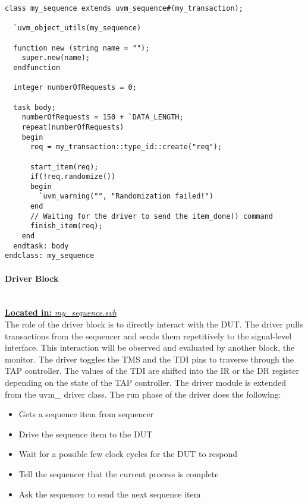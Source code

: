 \documentclass[a4paper,11pt]{article}
\begin{document}
\begin{lstlisting}[style={verilog-style}, backgroundcolor=\color{lightgray}]
class my_sequence extends uvm_sequence#(my_transaction);

  `uvm_object_utils(my_sequence)

  function new (string name = "");
    super.new(name);
  endfunction

  integer numberOfRequests = 0;

  task body;
    numberOfRequests = 150 + `DATA_LENGTH;
    repeat(numberOfRequests)
    begin
      req = my_transaction::type_id::create("req");

      start_item(req);
      if(!req.randomize())
      begin
        `uvm_warning("", "Randomization failed!")
      end
      // Waiting for the driver to send the item_done() command
      finish_item(req);  
    end
  endtask: body
endclass: my_sequence
\end{lstlisting}

\FloatBarrier
\paragraph{Driver Block}\mbox{}\\
\underline{\textbf{Located in:} \textit{my\_sequence.svh}}\\

The role of the driver block is to directly interact with the DUT. The driver pulls transactions from the sequencer and sends them repetitively to the signal-level interface. This interaction will be observed and evaluated by another block, the monitor. The driver toggles the TMS and the TDI pins to traverse through the TAP controller. The values of the TDI are shifted into the IR or the DR register depending on the state of the TAP controller. The driver module is extended from the uvm\_ driver class.
The run phase of the driver does the following:

\begin{itemize}[noitemsep]
\item Gets a sequence item from sequencer
\item Drive the sequence item to the DUT
\item Wait for a possible few clock cycles for the DUT to respond
\item Tell the sequencer that the current process is complete
\item Ask the sequencer to send the next sequence item
\end{itemize}
\end{document}
